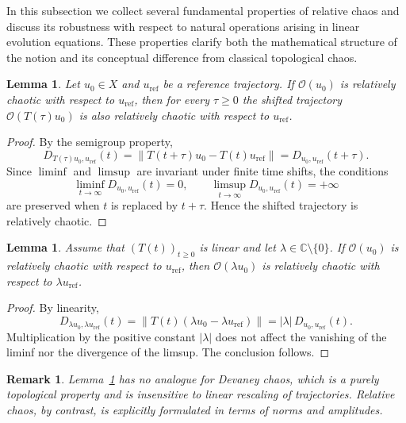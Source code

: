 \documentclass[12pt]{article}
\newtheorem{lemma}[theorem]{Lemma}
\newtheorem{remark}[theorem]{Remark}
\begin{document}
In this subsection we collect several fundamental properties of relative chaos and discuss its robustness with respect to natural operations arising in linear evolution equations. These properties clarify both the mathematical structure of the notion and its conceptual difference from classical topological chaos.


\begin{lemma}\label{lem:timeshift}
Let $u_0\in X$ and $u_{\mathrm{ref}}$ be a reference trajectory.
If $\mathcal{O}(u_0)$ is relatively chaotic with respect to
$u_{\mathrm{ref}}$, then for every $\tau\ge 0$ the shifted trajectory $\mathcal{O}(T(\tau)u_0)$ is also relatively chaotic with respect to $u_{\mathrm{ref}}$.
\end{lemma}

\begin{proof}
By the semigroup property,
\[
D_{T(\tau)u_0,u_{\mathrm{ref}}}(t)
=
\|T(t+\tau)u_0-T(t)u_{\mathrm{ref}}\|
=
D_{u_0,u_{\mathrm{ref}}}(t+\tau).
\]
Since $\liminf$ and $\limsup$ are invariant under finite time shifts, the conditions
\[
\liminf_{t\to\infty}D_{u_0,u_{\mathrm{ref}}}(t)=0,
\qquad
\limsup_{t\to\infty}D_{u_0,u_{\mathrm{ref}}}(t)=+\infty
\]
are preserved when $t$ is replaced by $t+\tau$. Hence the shifted trajectory is relatively chaotic.
\end{proof}

\begin{lemma}\label{lem:scaling}
Assume that $(T(t))_{t\ge 0}$ is linear and let $\lambda\in\mathbb{C}\setminus\{0\}$. If $\mathcal{O}(u_0)$ is relatively chaotic with respect to $u_{\mathrm{ref}}$,
then $\mathcal{O}(\lambda u_0)$ is relatively chaotic with respect to $\lambda u_{\mathrm{ref}}$.
\end{lemma}

\begin{proof}
By linearity,
\[
D_{\lambda u_0,\lambda u_{\mathrm{ref}}}(t)
=
\|T(t)(\lambda u_0-\lambda u_{\mathrm{ref}})\|
=
|\lambda|\,D_{u_0,u_{\mathrm{ref}}}(t).
\]
Multiplication by the positive constant $|\lambda|$ does not affect the vanishing of the liminf nor the divergence of the limsup. The conclusion follows.
\end{proof}

\begin{remark}
Lemma~\ref{lem:scaling} has no analogue for Devaney chaos, which is a purely topological property and is insensitive to linear rescaling of trajectories. Relative chaos, by contrast, is explicitly formulated in terms of norms and amplitudes.
\end{remark}
\end{document}
